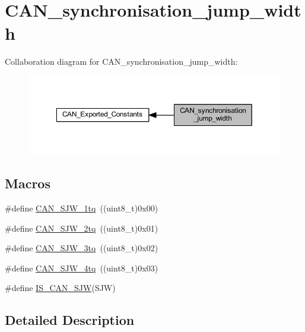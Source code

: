 \hypertarget{group___c_a_n__synchronisation__jump__width}{}\section{C\+A\+N\+\_\+synchronisation\+\_\+jump\+\_\+width}
\label{group___c_a_n__synchronisation__jump__width}
Collaboration diagram for C\+A\+N\+\_\+synchronisation\+\_\+jump\+\_\+width\+:
\nopagebreak
\begin{figure}[H]
\begin{center}
\leavevmode
\includegraphics[width=350pt]{group___c_a_n__synchronisation__jump__width}
\end{center}
\end{figure}
\subsection*{Macros}
\begin{DoxyCompactItemize}
\item 
\#define \hyperlink{group___c_a_n__synchronisation__jump__width_ga4e03d22ae683b63cb4df238449ec967c}{C\+A\+N\+\_\+\+S\+J\+W\+\_\+1tq}~((uint8\+\_\+t)0x00)
\item 
\#define \hyperlink{group___c_a_n__synchronisation__jump__width_gad39e7656c555cc00bc4d7c1bff39916f}{C\+A\+N\+\_\+\+S\+J\+W\+\_\+2tq}~((uint8\+\_\+t)0x01)
\item 
\#define \hyperlink{group___c_a_n__synchronisation__jump__width_gab4de740e2184aac71c2c8cba22a8ecd2}{C\+A\+N\+\_\+\+S\+J\+W\+\_\+3tq}~((uint8\+\_\+t)0x02)
\item 
\#define \hyperlink{group___c_a_n__synchronisation__jump__width_ga7f26a36d478c7ba1a1441b369d62f693}{C\+A\+N\+\_\+\+S\+J\+W\+\_\+4tq}~((uint8\+\_\+t)0x03)
\item 
\#define \hyperlink{group___c_a_n__synchronisation__jump__width_ga4e4f344712d3bcac1975318d4ab9a383}{I\+S\+\_\+\+C\+A\+N\+\_\+\+S\+JW}(S\+JW)
\end{DoxyCompactItemize}


\subsection{Detailed Description}


